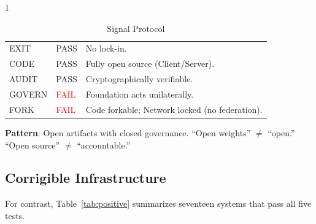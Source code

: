 \begin{table}[htbp]
    \begin{subtable}{1\textwidth}
        \centering
        \caption{Signal Protocol}
        \small
        \begin{tabular}{@{}llp{8.5cm}@{}}
            \toprule
            EXIT & \textcolor{green!50!black}{PASS} & No lock-in. \\
            CODE & \textcolor{green!50!black}{PASS} & Fully open source (Client/Server). \\
            AUDIT & \textcolor{green!50!black}{PASS} & Cryptographically verifiable. \\
            GOVERN & \textcolor{red}{FAIL} & Foundation acts unilaterally. \\
            FORK & \textcolor{red}{FAIL} & Code forkable; Network locked (no federation). \\
            \bottomrule
        \end{tabular}
    \end{subtable}
\end{table}

\textbf{Pattern}: Open artifacts with closed governance. ``Open weights'' $\neq$ ``open.'' ``Open source'' $\neq$ ``accountable.''

\subsection{Corrigible Infrastructure}

For contrast, Table~\ref{tab:positive} summarizes seventeen systems that pass all five tests.

